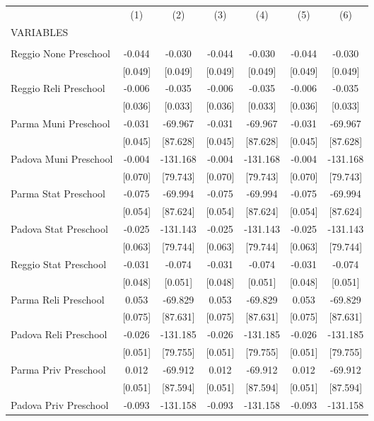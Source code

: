 \begin{tabular}{lcccccc} \hline
 & (1) & (2) & (3) & (4) & (5) & (6) \\
VARIABLES &  &  &  &  &  &  \\ \hline
 &  &  &  &  &  &  \\
Reggio None Preschool & -0.044 & -0.030 & -0.044 & -0.030 & -0.044 & -0.030 \\
 & [0.049] & [0.049] & [0.049] & [0.049] & [0.049] & [0.049] \\
Reggio Reli Preschool & -0.006 & -0.035 & -0.006 & -0.035 & -0.006 & -0.035 \\
 & [0.036] & [0.033] & [0.036] & [0.033] & [0.036] & [0.033] \\
Parma Muni Preschool & -0.031 & -69.967 & -0.031 & -69.967 & -0.031 & -69.967 \\
 & [0.045] & [87.628] & [0.045] & [87.628] & [0.045] & [87.628] \\
Padova Muni Preschool & -0.004 & -131.168 & -0.004 & -131.168 & -0.004 & -131.168 \\
 & [0.070] & [79.743] & [0.070] & [79.743] & [0.070] & [79.743] \\
Parma Stat Preschool & -0.075 & -69.994 & -0.075 & -69.994 & -0.075 & -69.994 \\
 & [0.054] & [87.624] & [0.054] & [87.624] & [0.054] & [87.624] \\
Padova Stat Preschool & -0.025 & -131.143 & -0.025 & -131.143 & -0.025 & -131.143 \\
 & [0.063] & [79.744] & [0.063] & [79.744] & [0.063] & [79.744] \\
Reggio Stat Preschool & -0.031 & -0.074 & -0.031 & -0.074 & -0.031 & -0.074 \\
 & [0.048] & [0.051] & [0.048] & [0.051] & [0.048] & [0.051] \\
Parma Reli Preschool & 0.053 & -69.829 & 0.053 & -69.829 & 0.053 & -69.829 \\
 & [0.075] & [87.631] & [0.075] & [87.631] & [0.075] & [87.631] \\
Padova Reli Preschool & -0.026 & -131.185 & -0.026 & -131.185 & -0.026 & -131.185 \\
 & [0.051] & [79.755] & [0.051] & [79.755] & [0.051] & [79.755] \\
Parma Priv Preschool & 0.012 & -69.912 & 0.012 & -69.912 & 0.012 & -69.912 \\
 & [0.051] & [87.594] & [0.051] & [87.594] & [0.051] & [87.594] \\
Padova Priv Preschool & -0.093 & -131.158 & -0.093 & -131.158 & -0.093 & -131.158 \\

\end{tabular}
